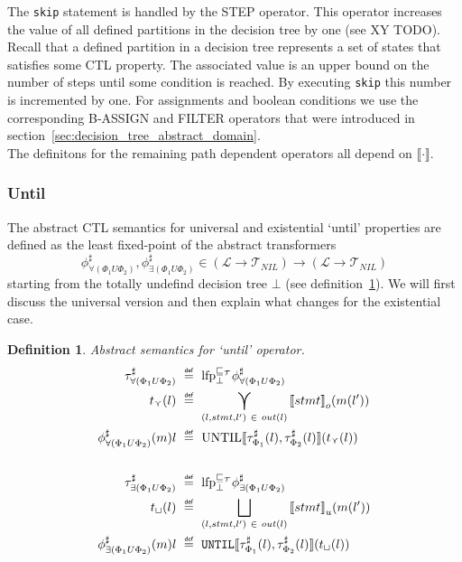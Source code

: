\documentclass[11pt,a4paper,titlepage]{article}
\newtheorem{definition}{Definition}[section]
\newcommand\eqdef{\mathrel{\overset{\makebox[0pt]{\mbox{\normalfont\tiny\sffamily def}}}{=}}}
\begin{document}
The \texttt{skip} statement is handled by the STEP operator. This operator increases the value of all defined
partitions in the decision tree by one (see XY TODO). Recall that a defined partition in a decision tree represents a set of states that satisfies 
some CTL property. The associated value is an upper bound on the number of steps until some condition is reached. 
By executing \texttt{skip} this number is incremented by one.
For assignments and boolean conditions we use the corresponding B-ASSIGN and FILTER 
operators that were introduced in section~\ref{sec:decision_tree_abstract_domain}.\\

The definitons for the remaining path dependent operators all depend on $\llbracket \cdot \rrbracket$.

\subsubsection*{Until}
The abstract CTL semantics for universal and existential `until' properties are defined as the least fixed-point of the abstract transformers
\[
\phi^\sharp_{\forall(\Phi_1 U \Phi_2)}, \phi^\sharp_{\exists(\Phi_1 U \Phi_2)} 
\in (\mathcal{L} \rightarrow \mathcal{T}_{NIL}) \rightarrow (\mathcal{L} \rightarrow \mathcal{T}_{NIL})
\]
starting from the 
totally undefind decision tree $\bot$ (see definition~\ref{def:abstract_until_semantics}).
We will first discuss the universal version and then explain what changes for the existential case.\\

\begin{definition}\label{def:abstract_until_semantics}
    Abstract semantics for `until' operator.
    \setlength{\jot}{15pt}
    \begin{align*}
        \tau^\sharp_{\forall(\Phi_1 U \Phi_2)} \ &\eqdef \ \text{lfp}^{\sqsubseteq_{\mathcal{T}}}_{\bot} \phi^\sharp_{\forall(\Phi_1 U \Phi_2)}\\
        t_{\curlyvee}(l)  \ &\eqdef \ \bigcurlyvee\limits_{(l, stmt, l') \ \in \ out(l) } {\llbracket stmt \rrbracket}_{o} ( m(l')) \\
        \phi^\sharp_{\forall(\Phi_1 U \Phi_2)}(m)l \ &\eqdef \ \text{UNTIL}\llbracket \tau^\sharp_{\Phi_1}(l), \tau^\sharp_{\Phi_2}(l) \rrbracket (t_{\curlyvee}(l))  \\\\
        \tau^\sharp_{\exists(\Phi_1 U \Phi_2)} \ &\eqdef \ \text{lfp}^{\sqsubseteq_{\mathcal{T}}}_{\bot} \phi^\sharp_{\exists(\Phi_1 U \Phi_2)}\\
        t_{\sqcup}(l) \ &\eqdef \ \bigsqcup\limits_{(l, stmt, l') \ \in \ out(l) } {\llbracket stmt \rrbracket}_{u} (m(l')) \\
        \phi^\sharp_{\exists(\Phi_1 U \Phi_2)}(m)l \ &\eqdef \ \mathtt{UNTIL}\llbracket \tau^\sharp_{\Phi_1}(l), \tau^\sharp_{\Phi_2}(l) \rrbracket ( t_{\sqcup}(l))
    \end{align*}
\end{definition}
\end{document}
